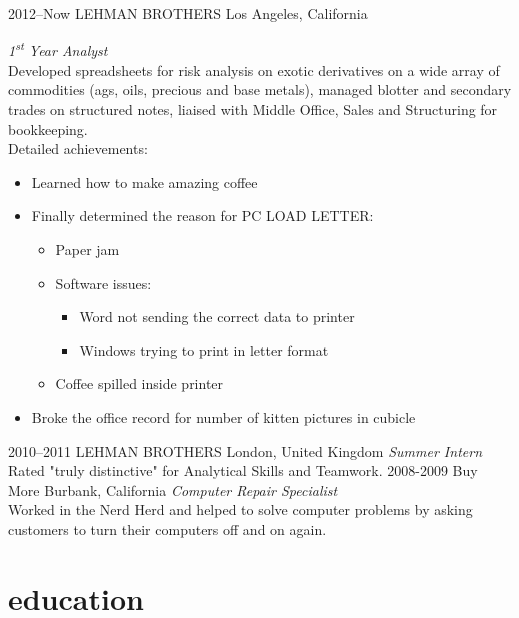 \documentclass[]{friggeri-cv} %
\begin{document}
\begin{entrylist}
\entry
{2012--Now}
{LEHMAN BROTHERS}
{Los Angeles, California}
{\emph{1\textsuperscript{st} Year Analyst} \\
Developed spreadsheets for risk analysis on exotic derivatives on a wide array of commodities (ags, oils, precious and base metals), managed blotter and secondary trades on structured notes, liaised with Middle Office, Sales and Structuring for bookkeeping. \\
Detailed achievements:
\begin{itemize}
\item Learned how to make amazing coffee
\item Finally determined the reason for \textsc{PC LOAD LETTER}:
\begin{itemize}
\item Paper jam
\item Software issues:
\begin{itemize}
\item Word not sending the correct data to printer
\item Windows trying to print in letter format
\end{itemize}
\item Coffee spilled inside printer
\end{itemize}
\item Broke the office record for number of kitten pictures in cubicle
\end{itemize}}
\entry
{2010--2011}
{LEHMAN BROTHERS}
{London, United Kingdom}
{\emph{Summer Intern} \\
Rated "truly distinctive" for Analytical Skills and Teamwork.}
\entry
{2008-2009}
{Buy More}
{Burbank, California}
{\emph{Computer Repair Specialist} \\
Worked in the Nerd Herd and helped to solve computer problems by asking customers to turn their computers off and on again.}
\end{entrylist}

\section{education}
\end{document}
